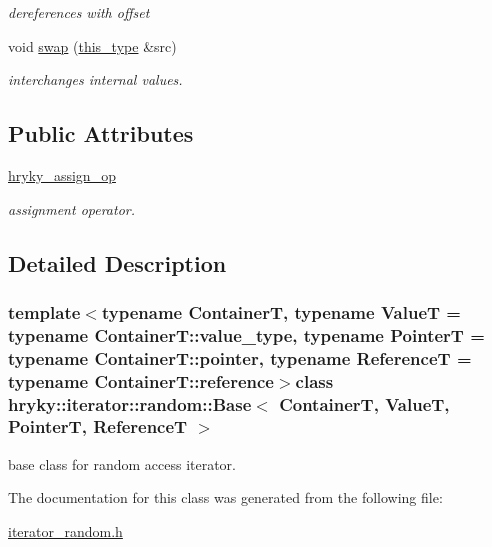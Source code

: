 \begin{DoxyCompactItemize}
\begin{DoxyCompactList}\small\item\em dereferences with offset \end{DoxyCompactList}\item 
\hypertarget{classhryky_1_1iterator_1_1random_1_1_base_acc5694bc21edc91c97d8b55d80b6f110}{void \hyperlink{classhryky_1_1iterator_1_1random_1_1_base_acc5694bc21edc91c97d8b55d80b6f110}{swap} (\hyperlink{classhryky_1_1iterator_1_1random_1_1_base}{this\-\_\-type} \&src)}\label{classhryky_1_1iterator_1_1random_1_1_base_acc5694bc21edc91c97d8b55d80b6f110}

\begin{DoxyCompactList}\small\item\em interchanges internal values. \end{DoxyCompactList}\end{DoxyCompactItemize}
\subsection*{Public Attributes}
\begin{DoxyCompactItemize}
\item 
\hypertarget{classhryky_1_1iterator_1_1random_1_1_base_a3fc3be5c70c5f2e46d4494c3dbf40598}{\hyperlink{classhryky_1_1iterator_1_1random_1_1_base_a3fc3be5c70c5f2e46d4494c3dbf40598}{hryky\-\_\-assign\-\_\-op}}\label{classhryky_1_1iterator_1_1random_1_1_base_a3fc3be5c70c5f2e46d4494c3dbf40598}

\begin{DoxyCompactList}\small\item\em assignment operator. \end{DoxyCompactList}\end{DoxyCompactItemize}


\subsection{Detailed Description}
\subsubsection*{template$<$typename Container\-T, typename Value\-T = typename Container\-T\-::value\-\_\-type, typename Pointer\-T = typename Container\-T\-::pointer, typename Reference\-T = typename Container\-T\-::reference$>$class hryky\-::iterator\-::random\-::\-Base$<$ Container\-T, Value\-T, Pointer\-T, Reference\-T $>$}

base class for random access iterator. 

The documentation for this class was generated from the following file\-:\begin{DoxyCompactItemize}
\item 
\hyperlink{iterator__random_8h}{iterator\-\_\-random.\-h}\end{DoxyCompactItemize}
